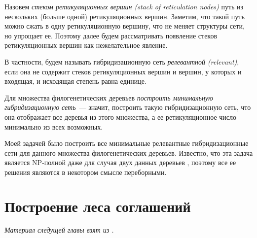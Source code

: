 \documentclass[14pt]{matmex-diploma-custom}
\begin{document}
    Назовем \textit{стеком ретикуляционных вершин (stack of reticulation nodes)} путь из нескольких (больше одной) ретикуляционных вершин. Заметим, что такой путь можно сжать в одну ретикуляционную вершину, что не меняет структуры сети, но упрощает ее. Поэтому далее будем рассматривать появление стеков ретикуляционных вершин как нежелательное явление.
    
    В частности, будем называть гибридизационную сеть \textit{релевантной (relevant)}, если она не содержит стеков ретикуляционных вершин и вершин, у которых и входящая, и исходящая степень равна единице.
    
    Для множества филогенетических деревьев \textit{построить минимальную гибридизационную сеть}~--- 
    значит, построить такую гибридизационную сеть, что она отображает все деревья из этого
    множества, а ее ретикуляционное число минимально из всех возможных.
    
    Моей задачей было построить все минимальные релевантные гибридизационные сети для данного множества
    филогенетических деревьев. Известно, что эта задача является NP-полной даже для случая
    двух данных деревьев \cite{Bordewich2007914}, поэтому все ее решения являются в некотором смысле переборными.

\section{Построение леса соглашений}
    \textit{Материал следущей главы взят из \cite{ediss19444}.}
\end{document}
